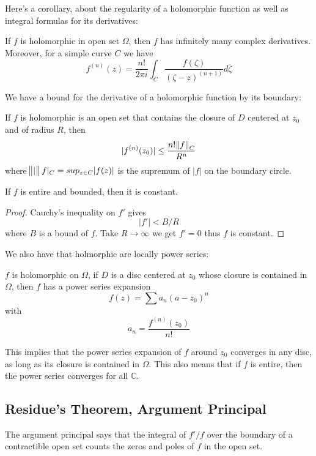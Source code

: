 \documentclass[main.tex]{subfiles}
\begin{document}
Here's a corollary, about the regularity of a holomorphic function as well as integral formulas for its derivatives:

\begin{corollary} 
If $f$ is holomorphic in open set $\Omega$, then $f$ has infinitely many complex derivatives. Moreover, for a simple curve $C$ we have 
$$
f^{(n)}(z) = \frac{n!}{2\pi i} \int_C \frac{f(\zeta)}{(\zeta - z)^{(n+1)}} d\zeta
$$
\end{corollary}

We have a bound for the derivative of a holomorphic function by its boundary:
\begin{corollary}
If $f$ is holomorphic is an open set that contains the closure of $D$ centered at $z_0$ and of radius $R$, then 
$$
|f^{(n)} (z_0)| \leq \frac{n! \norm{f}_C}{R^n}
$$
where $\norm|f|_C = sup_{z \in C}|f(z)|$ is the supremum of $|f|$ on the boundary circle.
\end{corollary}

\begin{corollary}
If $f$ is entire and bounded, then it is constant.
\end{corollary}
\begin{proof}
Cauchy's inequality on $f'$ gives 
$$
|f'| < B/R
$$
where $B$ is a bound of $f$. Take $R \rightarrow \infty$ we get $f' = 0$ thus $f$ is constant. 
\end{proof}

We also have that holmorphic are locally power series:

\begin{theorem}
$f$ is holomorphic on $\Omega$, if $D$ is a disc centered at $z_0$ whose closure is contained in $\Omega$, then $f$ has a power series expansion
$$
f(z) = \sum a_n (a - z_0)^n
$$
with 
$$
a_n = \frac{f^{(n)}(z_0)}{n!}
$$
\end{theorem}

This implies that the power series expansion of $f$ around $z_0$ converges in any disc, as long as its closure is contained in $\Omega$. This also means that if $f$ is entire, then the power series converges for all $\mathbb{C}$.


\subsection{Residue's Theorem, Argument Principal}

The argument principal says that the integral of $f'/f$ over the boundary of a contractible open set counts the zeros and poles of $f$ in the open set.
\end{document}
